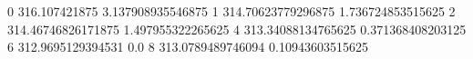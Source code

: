 0 316.107421875 3.137908935546875
1 314.70623779296875 1.736724853515625
2 314.46746826171875 1.497955322265625
4 313.34088134765625 0.371368408203125
6 312.9695129394531 0.0
8 313.0789489746094 0.10943603515625
